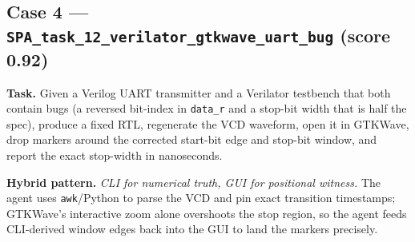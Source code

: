 \documentclass{llmxive}
\begin{document}
\subsection{Case 4 --- \texttt{SPA\_task\_12\_verilator\_gtkwave\_uart\_bug} (score 0.92)}
\label{app:case-uart}

\textbf{Task.} Given a Verilog UART transmitter and a Verilator testbench that both contain bugs (a reversed bit-index in \texttt{data\_r} and a stop-bit width that is half the spec), produce a fixed RTL, regenerate the VCD waveform, open it in GTKWave, drop markers around the corrected start-bit edge and stop-bit window, and report the exact stop-width in nanoseconds.

\textbf{Hybrid pattern.} \emph{CLI for numerical truth, GUI for positional witness.} The agent uses \texttt{awk}/Python to parse the VCD and pin exact transition timestamps; GTKWave's interactive zoom alone overshoots the stop region, so the agent feeds CLI-derived window edges back into the GUI to land the markers precisely.
\end{document}
